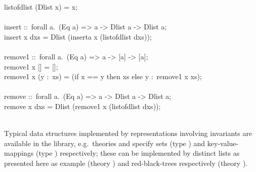 \begin{isabellebody}
\begin{isamarkuptext}
\hspace*{0pt}list{}of{}dlist (Dlist x) = x;\\
\hspace*{0pt}\\
\hspace*{0pt}insert ::~forall a.~(Eq a) => a -> Dlist a -> Dlist a;\\
\hspace*{0pt}insert x dxs = Dlist (inserta x (list{}of{}dlist dxs));\\
\hspace*{0pt}\\
\hspace*{0pt}remove1 ::~forall a.~(Eq a) => a -> [a] -> [a];\\
\hspace*{0pt}remove1 x [] = [];\\
\hspace*{0pt}remove1 x (y :~xs) = (if x == y then xs else y :~remove1 x xs);\\
\hspace*{0pt}\\
\hspace*{0pt}remove ::~forall a.~(Eq a) => a -> Dlist a -> Dlist a;\\
\hspace*{0pt}remove x dxs = Dlist (remove1 x (list{}of{}dlist dxs));\\
\hspace*{0pt}\\
\hspace*{0pt}{\char125}%
\end{isamarkuptext}%
\isamarkuptrue%
%
\endisatagquote
{\isafoldquote}%
%
\isadelimquote
%
\endisadelimquote
%
\begin{isamarkuptext}%
Typical data structures implemented by representations involving
  invariants are available in the library, e.g.~theories \hyperlink{theory.Fset}{\mbox{}} and \hyperlink{theory.Mapping}{\mbox{}} specify sets (type ) and
  key-value-mappings (type ) respectively;
  these can be implemented by distinct lists as presented here as
  example (theory \hyperlink{theory.Dlist}{\mbox{}}) and red-black-trees respectively
  (theory \hyperlink{theory.RBT}{\mbox{}}).%
\end{isamarkuptext}%
\isamarkuptrue%
%
\isadelimtheory
%
\endisadelimtheory
%
\isatagtheory
{}\isamarkupfalse%
%
\endisatagtheory
{\isafoldtheory}%
%
\isadelimtheory
%
\endisadelimtheory
\isanewline
\end{isabellebody}%
